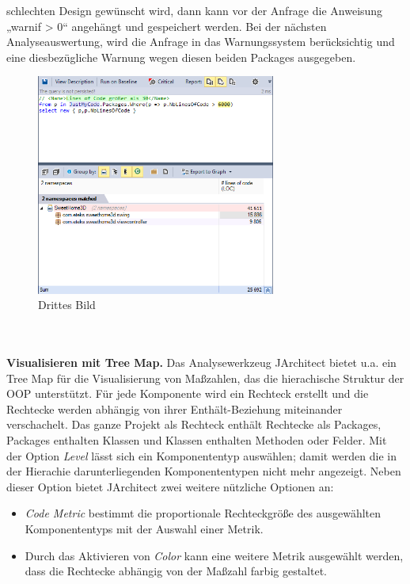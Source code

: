 \documentclass[12pt]{article}
\begin{document}
schlechten Design gewünscht wird, dann kann vor der Anfrage die
Anweisung „warnif > 0“ angehängt und gespeichert werden. Bei der
nächsten Analyseauswertung, wird die Anfrage in das
Warnungssystem berücksichtig und eine diesbezügliche Warnung
wegen diesen beiden Packages ausgegeben.
\begin{figure} 
  \centering
  \includegraphics[width=0.7\textwidth]{../Images/SchwellenwertLineofCode.PNG}
 \caption{Drittes Bild}
  \label{fig:Bild3}
\end{figure}
~\\ 
\\
\textbf{Visualisieren mit Tree Map.} Das Analysewerkzeug
JArchitect bietet u.a. ein Tree Map für die Visualisierung von
Maßzahlen, das die hierachische Struktur der OOP unterstützt.
Für jede Komponente wird ein Rechteck erstellt und die Rechtecke
werden abhängig von ihrer Enthält-Beziehung miteinander
verschachelt. Das ganze Projekt als Rechteck enthält Rechtecke
als Packages, Packages enthalten Klassen und Klassen enthalten
Methoden oder Felder. Mit der Option \textit{Level} lässt sich
ein Komponententyp auswählen; damit werden die in der Hierachie
darunterliegenden Komponententypen nicht mehr angezeigt. Neben
dieser Option bietet JArchitect zwei weitere nützliche Optionen an:
\begin{itemize}
        \item \textit{Code Metric} bestimmt die proportionale 
                Rechteckgröße des ausgewählten
                Komponententyps mit der Auswahl einer Metrik.
        \item  Durch das Aktivieren von \textit{Color}
               kann eine weitere Metrik ausgewählt werden, dass  
               die Rechtecke abhängig von der Maßzahl farbig
               gestaltet.
\end{itemize}
\end{document}
